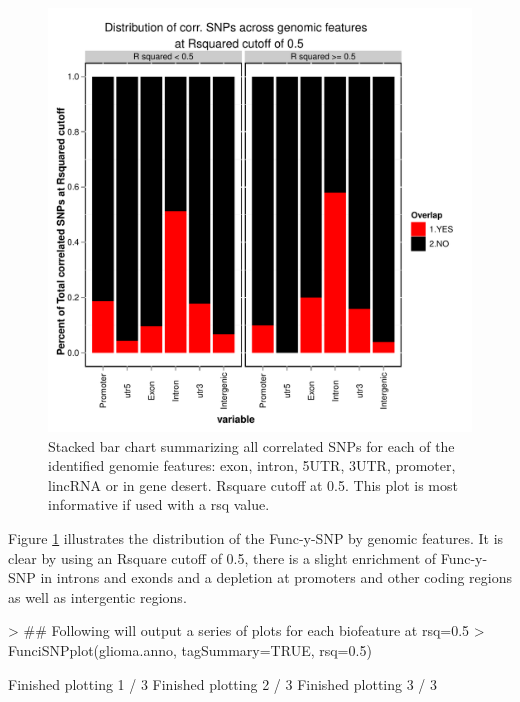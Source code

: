 \documentclass[12pt,fullpage]{article}
\begin{document}
\begin{figure}[ht!]
\begin{center}
\includegraphics{glioma_genomic_sum_rcut.pdf}
\caption{\label{fig:glioma_genomic_sum_rcut.pdf} Stacked bar chart summarizing 
all correlated SNPs for each of the identified genomie features: exon, intron, 
5UTR, 3UTR, promoter, lincRNA or in gene desert. Rsquare cutoff
 at 0.5. This plot is most informative if used with a rsq value.}
{\footnotesize{}}
\end{center}
\end{figure}

Figure \ref{fig:glioma_genomic_sum_rcut.pdf} illustrates the distribution of the
Func-y-SNP by genomic features. It is clear by using an Rsquare cutoff of 0.5,
there is a slight enrichment of Func-y-SNP in introns and exonds and a depletion
at promoters and other coding regions as well as intergentic regions.

\begin{Schunk}
\begin{Sinput}
> ## Following will output a series of plots for each biofeature at rsq=0.5
> FunciSNPplot(glioma.anno, tagSummary=TRUE, rsq=0.5)
\end{Sinput}
\begin{Soutput}
Finished plotting  1 / 3 
Finished plotting  2 / 3 
Finished plotting  3 / 3 
\end{Soutput}
\end{Schunk}
\end{document}
